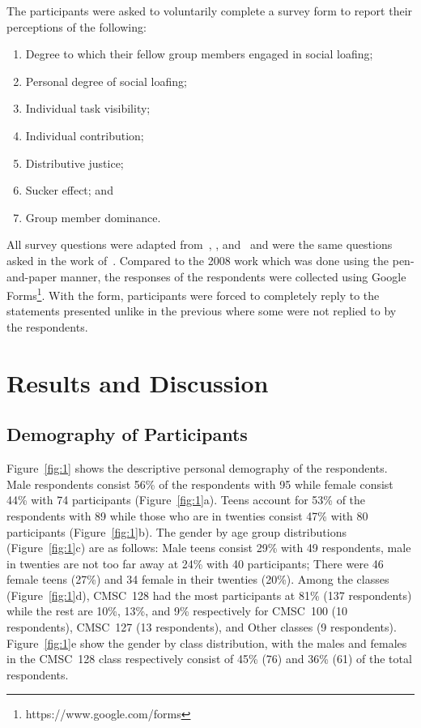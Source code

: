 \documentclass[a4paper,a4paper,BCOR12mm,12pt,abstracton,pointednumbers,tablecaptionabove,footinclude,halfparskip,normalheadings,]{scrartcl}
\begin{document}
The participants were asked to voluntarily complete a survey form to report their perceptions of the following: 
\begin{enumerate}
\item Degree to which their fellow group members engaged in social loafing; 
\item Personal degree of social loafing; 
\item Individual task visibility; 
\item Individual contribution; 
\item Distributive justice; 
\item Sucker effect; and 
\item Group member dominance. 
\end{enumerate}

All survey questions were adapted from~\citet{George92}, \citet{Piezon08}, and~\citet{Welbourne95} and were the same questions asked in the work of~\citet{Pabico08}. Compared to the 2008 work which was done using the pen-and-paper manner, the responses of the respondents were collected using Google Forms\footnote{https://www.google.com/forms}. With the form, participants were forced to completely reply to the statements presented unlike in the previous where some were not replied to by the respondents.

\section{Results and Discussion}\label{sec:result}

\subsection{Demography of Participants}

Figure~\ref{fig:1} shows the descriptive personal demography of the respondents. Male respondents consist 56\% of the respondents with 95 while female consist 44\% with 74 participants (Figure~\ref{fig:1}a). Teens account for 53\% of the respondents with 89 while those who are in twenties consist 47\% with 80 participants (Figure~\ref{fig:1}b). The gender by age group distributions (Figure~\ref{fig:1}c) are as follows: Male teens consist 29\% with 49 respondents, male in twenties are not too far away at 24\% with 40 participants; There were 46 female teens (27\%) and 34 female in their twenties (20\%). Among the classes (Figure~\ref{fig:1}d), CMSC~128 had the most participants at 81\% (137 respondents) while the rest are 10\%, 13\%, and 9\% respectively for CMSC~100 (10 respondents), CMSC~127 (13 respondents), and Other classes (9 respondents). Figure~\ref{fig:1}e show the gender by class distribution, with the males and females in the CMSC~128 class respectively consist of 45\% (76) and 36\% (61) of the total respondents.
\end{document}
